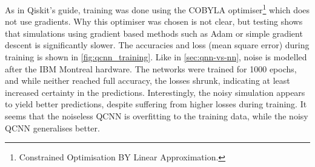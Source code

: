 As in Qiskit's guide, training was done using the COBYLA optimiser\footnote{Constrained Optimisation BY Linear Approximation.} which does not use gradients.
Why this optimiser was chosen is not clear, but testing shows that simulations using gradient based methods such as Adam or simple gradient descent is significantly slower.
The accuracies and loss (mean square error) during training is shown in \cref{fig:qcnn_training}.
Like in \cref{sec:qnn-vs-nn}, noise is modelled after the IBM Montreal hardware.
The networks were trained for 1000 epochs, and while neither reached full accuracy, the losses shrunk, indicating at least increased certainty in the predictions.
Interestingly, the noisy simulation appears to yield better predictions, despite suffering from higher losses during training.
It seems that the noiseless QCNN is overfitting to the training data, while the noisy QCNN generalises better.


